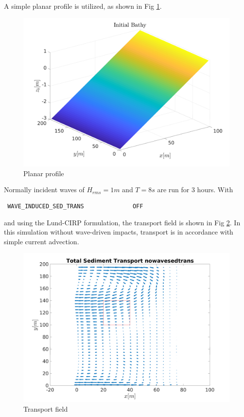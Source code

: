 \documentclass[12pt,oneside]{article}
\begin{document}
A simple planar profile is utilized, as shown in Fig \ref{fig1}.
\begin{figure}
  \begin{center}
    \includegraphics[width=.8\linewidth]{./zb_init.png}
  \end{center}
  \caption{Planar profile}
  \label{fig1}
\end{figure}
Normally incident waves of $H_{rms} = 1m$ and $T= 8s$ are run for 3 hours.  With
\begin{verbatim}
 WAVE_INDUCED_SED_TRANS              OFF
\end{verbatim}
and using the Lund-CIRP formulation, the transport field is shown in
Fig \ref{fig2}.  In this simulation without wave-driven impacts, transport
is in accordance with simple current advection.
\begin{figure}
  \begin{center}
    \includegraphics[width=.8\linewidth]{./transport_vec_nowavesedtrans.png}
  \end{center}
  \caption{Transport field}
  \label{fig2}
\end{figure}
\end{document}
